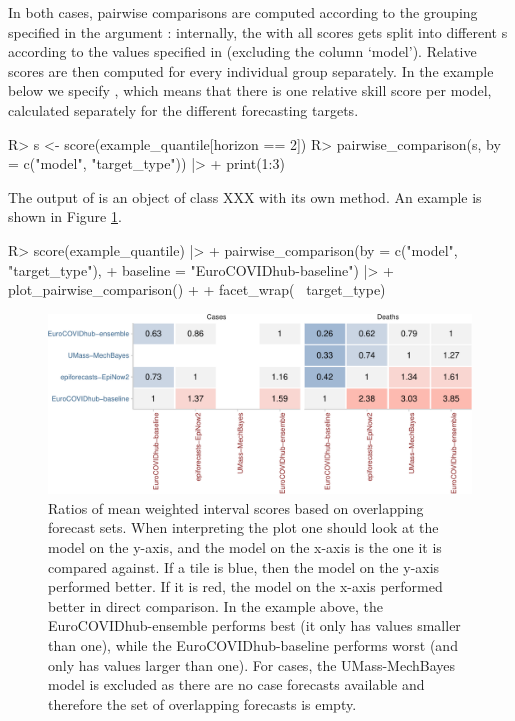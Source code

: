 \documentclass[
]{jss}
\begin{document}
In both cases, pairwise comparisons are computed according to the
grouping specified in the argument : internally, the
 with all scores gets split into different
s according to the values specified in 
(excluding the column `model'). Relative scores are then computed for
every individual group separately. In the example below we specify
, which means that there is one
relative skill score per model, calculated separately for the different
forecasting targets.

\begin{CodeChunk}
\begin{CodeInput}
R> s <- score(example_quantile[horizon == 2])
R> pairwise_comparison(s, by = c("model", "target_type")) |>
+   print(1:3)
\end{CodeInput}
\end{CodeChunk}

The output of  is an object of class XXX
with its own  method. An example is shown in Figure
\ref{fig:pairwise-plot}.

\begin{CodeChunk}
\begin{CodeInput}
R> score(example_quantile) |>
+   pairwise_comparison(by = c("model", "target_type"), 
+                       baseline = "EuroCOVIDhub-baseline") |>
+   plot_pairwise_comparison() + 
+   facet_wrap(~ target_type)
\end{CodeInput}
\begin{figure}

{\centering \includegraphics[width=1\linewidth]{manuscript_files/figure-latex/pairwise-plot-1} 

}

\caption[Ratios of mean weighted interval scores based on overlapping forecast sets]{Ratios of mean weighted interval scores based on overlapping forecast sets. When interpreting the plot one should look at the model on the y-axis, and the model on the x-axis is the one it is compared against. If a tile is blue, then the model on the y-axis performed better. If it is red, the model on the x-axis performed better in direct comparison. In the example above, the EuroCOVIDhub-ensemble performs best (it only has values smaller than one), while the EuroCOVIDhub-baseline performs worst (and only has values larger than one). For cases, the UMass-MechBayes model is excluded as there are no case forecasts available and therefore the set of overlapping forecasts is empty.}\label{fig:pairwise-plot}
\end{figure}
\end{CodeChunk}
\end{document}

